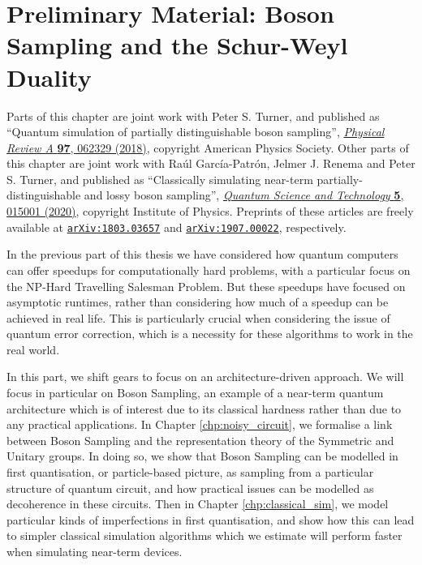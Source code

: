 \chapter{Preliminary Material: Boson Sampling and the Schur-Weyl Duality}
\label{chp:preliminary_bs}

Parts of this chapter are joint work with Peter S. Turner, and published as ``Quantum simulation of partially distinguishable boson sampling'', \href{https://link.aps.org/doi/10.1103/PhysRevA.97.062329}{\textit{Physical Review A} \textbf{97}, 062329 (2018)}, copyright American Physics Society. Other parts of this chapter are joint work with Ra\'ul Garc\'ia-Patr\'on, Jelmer J. Renema and Peter S. Turner, and published as ``Classically simulating near-term partially-distinguishable and lossy boson sampling'', \href{https://iopscience.iop.org/article/10.1088/2058-9565/ab5555}{\textit{Quantum Science and Technology} \textbf{5}, 015001 (2020)}, copyright Institute of Physics. Preprints of these articles are freely available at {\tt \href{https://arxiv.org/abs/1803.03657}{arXiv:1803.03657}} and {\tt \href{https://arxiv.org/abs/1907.00022}{arXiv:1907.00022}}, respectively.

In the previous part of this thesis we have considered how quantum computers can offer speedups for computationally hard problems, with a particular focus on the NP-Hard Travelling Salesman Problem. But these speedups have focused on asymptotic runtimes, rather than considering how much of a speedup can be achieved in real life. This is particularly crucial when considering the issue of quantum error correction, which is a necessity for these algorithms to work in the real world.

In this part, we shift gears to focus on an architecture-driven approach. We will focus in particular on Boson Sampling, an example of a near-term quantum architecture which is of interest due to its classical hardness rather than due to any practical applications. In Chapter \ref{chp:noisy_circuit}, we formalise a link between Boson Sampling and the representation theory of the Symmetric and Unitary groups. In doing so, we show that Boson Sampling can be modelled in first quantisation, or particle-based picture, as sampling from a particular structure of quantum circuit, and how practical issues can be modelled as decoherence in these circuits. Then in Chapter \ref{chp:classical_sim}, we model particular kinds of imperfections in first quantisation, and show how this can lead to simpler classical simulation algorithms which we estimate will perform faster when simulating near-term devices.

